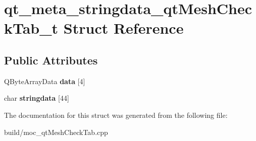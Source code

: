 \hypertarget{structqt__meta__stringdata__qt_mesh_check_tab__t}{}\section{qt\+\_\+meta\+\_\+stringdata\+\_\+qt\+Mesh\+Check\+Tab\+\_\+t Struct Reference}
\label{structqt__meta__stringdata__qt_mesh_check_tab__t}
\subsection*{Public Attributes}
\begin{DoxyCompactItemize}
\item 
\hypertarget{structqt__meta__stringdata__qt_mesh_check_tab__t_aa3d2c1885b8c41729eb9a62612f31557}{}Q\+Byte\+Array\+Data {\bfseries data} \mbox{[}4\mbox{]}\label{structqt__meta__stringdata__qt_mesh_check_tab__t_aa3d2c1885b8c41729eb9a62612f31557}

\item 
\hypertarget{structqt__meta__stringdata__qt_mesh_check_tab__t_aeeaed4036c394dd7d5963931b66215c1}{}char {\bfseries stringdata} \mbox{[}44\mbox{]}\label{structqt__meta__stringdata__qt_mesh_check_tab__t_aeeaed4036c394dd7d5963931b66215c1}

\end{DoxyCompactItemize}


The documentation for this struct was generated from the following file\+:\begin{DoxyCompactItemize}
\item 
build/moc\+\_\+qt\+Mesh\+Check\+Tab.\+cpp\end{DoxyCompactItemize}
